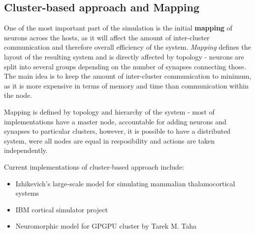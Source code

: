 \subsection{Cluster-based approach and Mapping}

One of the most important part of the simulation is the initial \textbf{mapping} of neurons across the hosts, as it will affect the amount of inter-cluster communication and therefore overall efficiency
of the system. \emph{Mapping} defines the layout of the resulting system and is directly affected by topology - neurons are split into several groups depending on the number of synapses connecting those.
The main idea is to keep the amount of inter-cluster communication to minimum, as it is more expensive in terms of memory and time than communication within the node.

Mapping is defined by topology and hierarchy of the system - most of implementations have a master node, accountable for adding neurons and synapses to particular clusters, however, it is
possible to have a distributed system, were all nodes are equal in resposibility and actions are taken independently.

Current implementations of cluster-based approach include:

\begin{itemize}
\item{Izhikevich's large-scale model for simulating mammalian thalamocortical systems \cite{EugeneM.Izhikevich2008}}
\item{IBM cortical simulator project\cite{DharmendraS.Modha2007}}
\item{Neuromorphic model for GPGPU cluster by Tarek M. Taha\cite{TarekM.Taha2010}}
\end{itemize}
